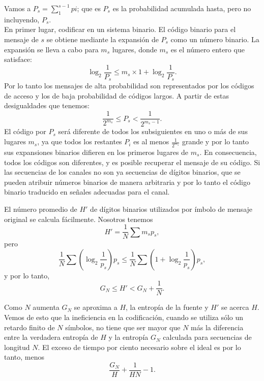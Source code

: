 Vamos a $P_{s}=\sum^{s-1}_{1} pi$; que es $P_{s}$ es la probabilidad
acumulada hasta, pero no incluyendo, $P_{s}$.\\ En primer lugar,
codificar en un sistema binario. El c\'odigo binario para el mensaje
de $s$ se obtiene mediante la expansi\'on de $P_{s}$ como un n\'umero
binario. La expansi\'on se lleva a cabo para $m_{s}$ lugares, donde
$m_{s}$ es el n\'umero entero que satisface:
\begin{equation}
\log_{2} \frac{1}{P_{s}}\leq m_{s} \times 1 + \log_{2}\frac{1}{P_{s}} .
\end{equation} 
Por lo tanto los mensajes de alta probabilidad son representados por los c\'odigos de acceso y los de baja 
probabilidad de c\'odigos largos. A partir de estas desigualdades que tenemos:
\begin{equation}
\frac{1}{2^{m_{s}}} \leq P_{s} < \frac{1}{2^{m_{s} -1}}.
\end{equation}
El c\'odigo por $P_{s}$ ser\'a diferente de todos los subsiguientes en
uno o m\'as de sus lugares $m_{s}$, ya que todos los restantes $P_{i}$
es al menos $\frac{1}{2^{m_{s}}}$ grande y por lo tanto sus
expansiones binarios difieren en los primeros lugares de $m_{s}$. En
consecuencia, todos los c\'odigos son diferentes, y es posible
recuperar el mensaje de su c\'odigo. Si las secuencias de los canales
no son ya secuencias de d\'igitos binarios, que se pueden atribuir
n\'umeros binarios de manera arbitraria y por lo tanto el c\'odigo
binario traducido en se\~{n}ales adecuadas para el canal.

El n\'umero promedio de $H'$ de d\'igitos binarios utilizados
por \'imbolo de mensaje original se calcula f\'acilmente. Nosotros
tenemos
\begin{equation}
H' = \frac{1}{N} \sum m_{s} p_{s},
\end{equation}
pero
\begin{equation}
\frac{1}{N} \sum (\log_{2} \frac{1}{p_{s}})p_{s} \leq \frac{1}{N} \sum (1+\log_{2} \frac{1}{p_{s}}) p_{s},
\end{equation}
y por lo tanto,
\begin{equation}
G_{N} \leq H' < G_{N} + \frac{1}{N}.
\end{equation}

Como $N$ aumenta $G_{N}$ se aproxima a $H$, la entrop\'ia de la fuente
y $H'$ se acerca $H$. Vemos de esto que la ineficiencia en la
codificaci\'on, cuando se utiliza s\'olo un retardo finito de $N$
s\'imbolos, no tiene que ser mayor que $N$ m\'as la diferencia entre
la verdadera entrop\'ia de $H$ y la entrop\'ia $G_{N}$ calculada para
secuencias de longitud $N$. El exceso de tiempo por ciento necesario
sobre el ideal es por lo tanto, menos
\begin{equation}
\frac{G_{N}}{H} + \frac{1}{HN} - 1.
\end{equation}

